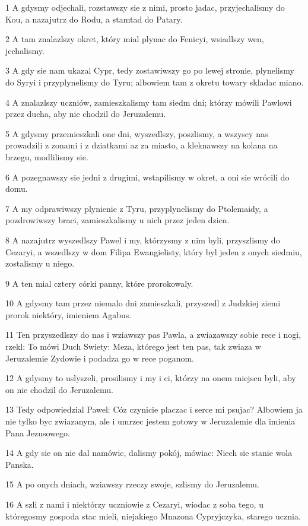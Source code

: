 \par 1 A gdysmy odjechali, rozstawszy sie z nimi, prosto jadac, przyjechalismy do Kou, a nazajutrz do Rodu, a stamtad do Patary.
\par 2 A tam znalazlszy okret, który mial plynac do Fenicyi, wsiadlszy wen, jechalismy.
\par 3 A gdy sie nam ukazal Cypr, tedy zostawiwszy go po lewej stronie, plynelismy do Syryi i przyplynelismy do Tyru; albowiem tam z okretu towary skladac miano.
\par 4 A znalazlszy uczniów, zamieszkalismy tam siedm dni; którzy mówili Pawlowi przez ducha, aby nie chodzil do Jeruzalemu.
\par 5 A gdysmy przemieszkali one dni, wyszedlszy, poszlismy, a wszyscy nas prowadzili z zonami i z dziatkami az za miasto, a kleknawszy na kolana na brzegu, modlilismy sie.
\par 6 A pozegnawszy sie jedni z drugimi, wstapilismy w okret, a oni sie wrócili do domu.
\par 7 A my odprawiwszy plynienie z Tyru, przyplynelismy do Ptolemaidy, a pozdrowiwszy braci, zamieszkalismy u nich przez jeden dzien.
\par 8 A nazajutrz wyszedlszy Pawel i my, którzysmy z nim byli, przyszlismy do Cezaryi, a wszedlszy w dom Filipa Ewangielisty, który byl jeden z onych siedmiu, zostalismy u niego.
\par 9 A ten mial cztery córki panny, które prorokowaly.
\par 10 A gdysmy tam przez niemalo dni zamieszkali, przyszedl z Judzkiej ziemi prorok niektóry, imieniem Agabus.
\par 11 Ten przyszedlszy do nas i wziawszy pas Pawla, a zwiazawszy sobie rece i nogi, rzekl: To mówi Duch Swiety: Meza, którego jest ten pas, tak zwiaza w Jeruzalemie Zydowie i podadza go w rece poganom.
\par 12 A gdysmy to uslyszeli, prosilismy i my i ci, którzy na onem miejscu byli, aby on nie chodzil do Jeruzalemu.
\par 13 Tedy odpowiedzial Pawel: Cóz czynicie placzac i serce mi psujac? Albowiem ja nie tylko byc zwiazanym, ale i umrzec jestem gotowy w Jeruzalemie dla imienia Pana Jezusowego.
\par 14 A gdy sie on nie dal namówic, dalismy pokój, mówiac: Niech sie stanie wola Panska.
\par 15 A po onych dniach, wziawszy rzeczy swoje, szlismy do Jeruzalemu.
\par 16 A szli z nami i niektórzy uczniowie z Cezaryi, wiodac z soba tego, u któregosmy gospoda stac mieli, niejakiego Mnazona Cypryjczyka, starego ucznia.
